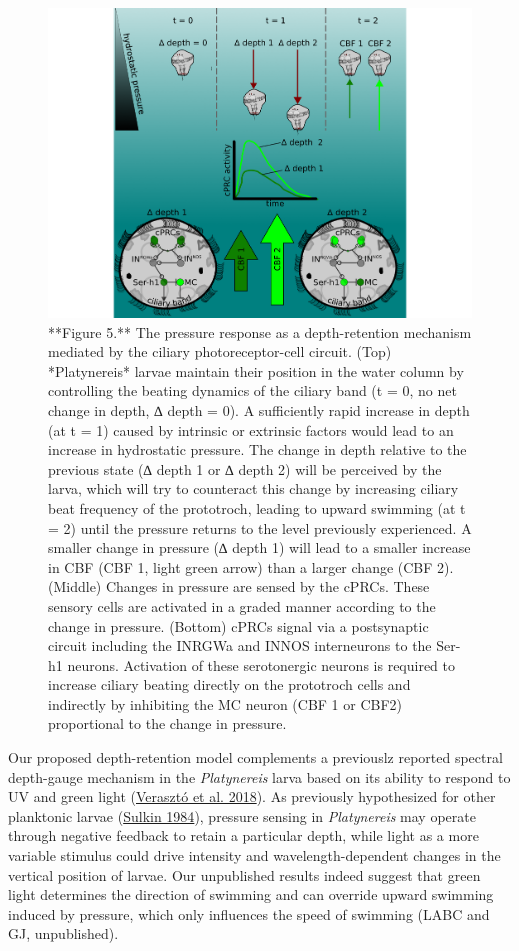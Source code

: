 \documentclass[
]{article}
\begin{document}
\begin{figure}
\includegraphics[width=56.21in]{Figures/Figure5} \caption{**Figure 5.** The pressure response as a depth-retention mechanism mediated by the ciliary photoreceptor-cell circuit. (Top) *Platynereis* larvae maintain their position in the water column by controlling the beating dynamics of the ciliary band (t = 0, no net change in depth, ∆ depth = 0). A sufficiently rapid increase in depth (at t = 1) caused by intrinsic or extrinsic factors would lead to an increase in hydrostatic pressure. The change in depth relative to the previous state (∆ depth 1 or ∆ depth 2) will be perceived by the larva, which will try to counteract this change by increasing ciliary beat frequency of the prototroch, leading to upward swimming (at t = 2) until the pressure returns to the level previously experienced. A smaller change in pressure (∆ depth 1) will lead to a smaller increase in CBF (CBF 1, light green arrow) than a larger change (CBF 2). (Middle) Changes in pressure are sensed by the cPRCs. These sensory cells are activated in a graded manner according to the change in pressure. (Bottom) cPRCs signal via a postsynaptic circuit including the INRGWa and INNOS interneurons to the Ser-h1 neurons. Activation of these serotonergic neurons is required to increase ciliary beating directly on the prototroch cells and indirectly by inhibiting the MC neuron (CBF 1 or CBF2) proportional to the change in pressure.}\label{fig:unnamed-chunk-6}
\end{figure}

Our proposed depth-retention model complements a previouslz reported
spectral depth-gauge mechanism in the \emph{Platynereis} larva based on
its ability to respond to UV and green light
(\protect\hyperlink{ref-veraszto2018}{Verasztó et al. 2018}). As
previously hypothesized for other planktonic larvae
(\protect\hyperlink{ref-sulkin_1984}{Sulkin 1984}), pressure sensing in
\emph{Platynereis} may operate through negative feedback to retain a
particular depth, while light as a more variable stimulus could drive
intensity and wavelength-dependent changes in the vertical position of
larvae. Our unpublished results indeed suggest that green light
determines the direction of swimming and can override upward swimming
induced by pressure, which only influences the speed of swimming (LABC
and GJ, unpublished).
\end{document}
